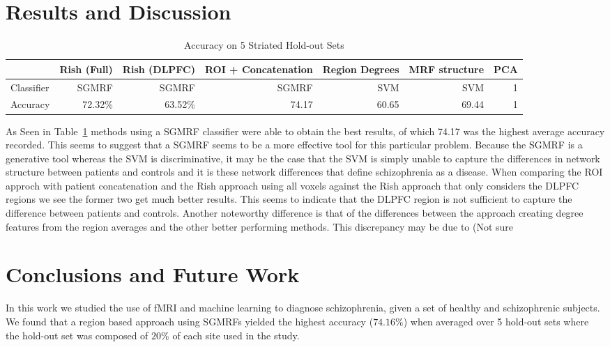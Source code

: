 \documentclass{article} %
\begin{document}
\section{Results and Discussion}

\begin{table}[!htb]\footnotesize
\begin{center}
    \begin{tabular}{| l | r | r | r | r | r | r |}
    \hline
                & Rish (Full) & Rish (DLPFC) & ROI + Concatenation & Region Degrees & MRF structure & PCA \\ \hline
    Classifier  & SGMRF       & SGMRF        & SGMRF               & SVM            & SVM           &1    \\ \hline
    Accuracy    & 72.32\%     & 63.52\%      & 74.17               & 60.65          & 69.44         &1    \\ \hline
    \end{tabular}
    \caption{Accuracy on 5 Striated Hold-out Sets}
     \label{fig:holdout_table}
\end{center}
\end{table}

As Seen in Table~\ref{fig:holdout_table} methods using a SGMRF classifier were
able to obtain the best results, of which 74.17 was the highest average
accuracy recorded. This seems to suggest that a SGMRF seems to be a more
effective tool for this particular problem. Because the SGMRF is a generative
tool whereas the SVM is discriminative, it may be the case that the SVM is
simply unable to capture the differences in network structure between patients
and controls and it is these network differences that define schizophrenia as
a disease. When comparing the ROI approch with patient concatenation and the
Rish approach using all voxels against the Rish approach that only considers
the DLPFC regions we see the former two get much better results. This seems
to indicate that the DLPFC region is not sufficient to capture the difference
between patients and controls. Another noteworthy difference is that of the
differences between the approach creating degree features from the region
averages and the other better performing methods. This discrepancy may be due
to (Not sure %


\section{Conclusions and Future Work}
In this work we studied the use of fMRI and machine learning to diagnose
schizophrenia, given a set of healthy and schizophrenic subjects. We found
that a region based approach using SGMRFs yielded the highest accuracy 
($74.16\%$) when averaged over 5 hold-out sets where the hold-out set was
composed of $20\%$ of each site used in the study.
\end{document}
